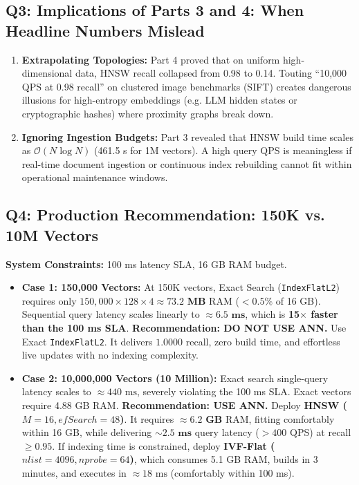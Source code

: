 \documentclass[11pt,a4paper]{article}
\begin{document}
\subsection{Q3: Implications of Parts 3 and 4: When Headline Numbers Mislead}
\begin{enumerate}
    \item \textbf{Extrapolating Topologies:} Part 4 proved that on uniform high-dimensional data, HNSW recall collapsed from 0.98 to 0.14. Touting ``10,000 QPS at 0.98 recall'' on clustered image benchmarks (SIFT) creates dangerous illusions for high-entropy embeddings (e.g. LLM hidden states or cryptographic hashes) where proximity graphs break down.
    \item \textbf{Ignoring Ingestion Budgets:} Part 3 revealed that HNSW build time scales as $\mathcal{O}(N \log N)$ (461.5 s for 1M vectors). A high query QPS is meaningless if real-time document ingestion or continuous index rebuilding cannot fit within operational maintenance windows.
\end{enumerate}

\subsection{Q4: Production Recommendation: 150K vs. 10M Vectors}
\textbf{System Constraints:} 100 ms latency SLA, 16 GB RAM budget.
\begin{itemize}
    \item \textbf{Case 1: 150,000 Vectors:}
    At 150K vectors, Exact Search (\texttt{IndexFlatL2}) requires only $150,000 \times 128 \times 4 \approx \mathbf{73.2\text{ MB}}$ RAM ($<0.5\%$ of 16 GB). Sequential query latency scales linearly to $\approx \mathbf{6.5\text{ ms}}$, which is \textbf{15$\times$ faster than the 100 ms SLA}. 
    \textbf{Recommendation: DO NOT USE ANN.} Use Exact \texttt{IndexFlatL2}. It delivers $1.0000$ recall, zero build time, and effortless live updates with no indexing complexity.
    \item \textbf{Case 2: 10,000,000 Vectors (10 Million):}
    Exact search single-query latency scales to $\approx 440\text{ ms}$, severely violating the 100 ms SLA. Exact vectors require 4.88 GB RAM.
    \textbf{Recommendation: USE ANN.}
    Deploy \textbf{HNSW ($M=16, efSearch=48$)}. It requires $\approx \mathbf{6.2\text{ GB}}$ RAM, fitting comfortably within 16 GB, while delivering $\sim \mathbf{2.5\text{ ms}}$ query latency ($>400$ QPS) at recall $\ge 0.95$. If indexing time is constrained, deploy \textbf{IVF-Flat ($nlist=4096, nprobe=64$)}, which consumes 5.1 GB RAM, builds in 3 minutes, and executes in $\approx 18\text{ ms}$ (comfortably within 100 ms).
\end{itemize}
\end{document}
